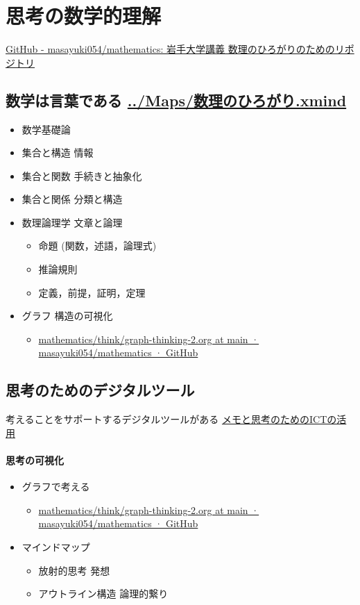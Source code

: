 \documentclass[dvipdfmx,11pat]{jarticle}
\begin{document}
\section{思考の数学的理解}
\label{sec:org95dfe0c}
\href{https://github.com/masayuki054/mathematics/tree/main}{GitHub - masayuki054/mathematics: 岩手大学講義 数理のひろがりのためのリポジトリ}
\subsection{数学は言葉である \url{../Maps/数理のひろがり.xmind}}
\label{sec:org55296a5}
\begin{itemize}
\item 数学基礎論
\item 集合と構造 情報
\item 集合と関数 手続きと抽象化
\item 集合と関係 分類と構造
\item 数理論理学 文章と論理
\begin{itemize}
\item 命題 (関数，述語，論理式)
\item 推論規則
\item 定義，前提，証明，定理
\end{itemize}
\item グラフ 構造の可視化
\begin{itemize}
\item \href{https://github.com/masayuki054/mathematics/blob/main/think/graph-thinking-2.org}{mathematics/think/graph-thinking-2.org at main · masayuki054/mathematics · GitHub}
\end{itemize}
\end{itemize}
\subsection{思考のためのデジタルツール}
\label{sec:org3dceb0d}
考えることをサポートするデジタルツールがある \href{https://masayuki054.github.io/ict\_literacy\_for\_thinking\_and\_memo/}{メモと思考のためのICTの活用}
\paragraph{思考の可視化}
\label{sec:org5424870}
\begin{itemize}
\item グラフで考える
\begin{itemize}
\item \href{https://github.com/masayuki054/mathematics/blob/main/think/graph-thinking-2.org}{mathematics/think/graph-thinking-2.org at main · masayuki054/mathematics · GitHub}
\end{itemize}
\item マインドマップ
\begin{itemize}
\item 放射的思考 発想
\item アウトライン構造 論理的繋り
\end{itemize}
\end{itemize}
\end{document}
